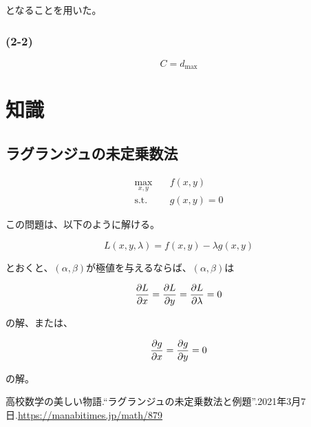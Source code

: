 \documentclass[a4paper, 10pt, dvipdfmx]{jlreq}
\begin{document}
となることを用いた。

\subsubsection*{(2-2)}

\begin{equation*}
  C=d_{\text{max}}
\end{equation*}

\section{知識}

\subsection{ラグランジュの未定乗数法}

\begin{align*}
  \max_{x,y} \quad  & f(x,y)     \\
  \text{s.t.} \quad & g(x,y) = 0
\end{align*}

この問題は、以下のように解ける。

\begin{equation*}
  L(x,y,\lambda) = f(x,y) - \lambda g(x,y)
\end{equation*}

とおくと、$(\alpha,\beta)$が極値を与えるならば、$(\alpha,\beta)$は

\begin{equation*}
  \pdv{L}{x} = \pdv{L}{y} = \pdv{L}{\lambda} = 0
\end{equation*}

の解、または、

\begin{equation*}
  \pdv{g}{x} = \pdv{g}{y} = 0
\end{equation*}

の解。\cite{site:1}

\begin{thebibliography}{9}
  高校数学の美しい物語.``ラグランジュの未定乗数法と例題''.2021年3月7日.\url{https://manabitimes.jp/math/879}
\end{thebibliography}
\end{document}
